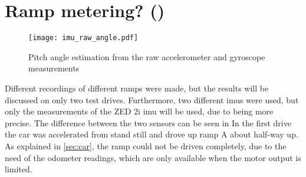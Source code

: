 \section{Ramp metering? ()}
\begin{figure}[htbp]
	\centering
	\texttt{[image: imu\_raw\_angle.pdf]}
	\caption[Raw]{Pitch angle estimation from the raw accelerometer and gyroscope measurements}
	\label{fig:imu_raw_angle}
\end{figure}
Different recordings of different ramps were made, but the results will be discussed on only two test drives.
Furthermore, two different \glspl{imu} were used, but only the measurements of the ZED 2i \gls{imu} will be used, due to being more precise.
The difference between the two sensors can be seen in
In the first drive the car was accelerated from stand still and drove up ramp A about half-way up.
As explained in \cref{sec:car}, the ramp could not be driven completely, due to the need of the odometer readings, which are only available when the motor output is limited.
